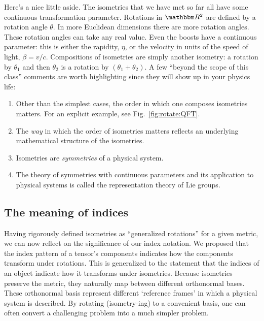 \documentclass[12pt]{article}
\begin{document}
Here's a nice little aside. The isometries that we have met so far all have some continuous transformation parameter. Rotations in $\RR^2$ are defined by  a rotation angle $\theta$. In more Euclidean dimensions there are more rotation angles. These rotation angles can take any real value. Even the boosts have a continuous parameter: this is either the rapidity, $\eta$, or the velocity in units of the speed of light, $\beta = v/c$. Compositions of isometries are simply another isometry: a rotation by $\theta_1$ and then $\theta_2$ is a rotation by $(\theta_1+\theta_2)$. A few ``beyond the scope of this class'' comments are worth highlighting since they will show up in your physics life:
\begin{enumerate}
    \item Other than the simplest cases, the order in which one composes isometries matters. For an explicit example, see Fig.~\ref{fig:rotate:QFT}.
    \item The \emph{way} in which the order of isometries matters reflects an underlying mathematical structure of the isometries. 
    \item Isometries are \emph{symmetries} of a physical system. 
    \item The theory of symmetries with continuous parameters and its application to physical systems is called the representation theory of Lie groups. 
\end{enumerate}






\subsection{The meaning of indices}

Having rigorously defined isometries as ``generalized rotations'' for a given metric, we can now reflect on the significance of our index notation. We proposed that the index pattern of a tensor's components indicates how the components transform under rotations. This is generalized to the statement that the indices of an object indicate how it transforms under isometries. Because isometries preserve the metric, they naturally map between different orthonormal bases. These orthonormal basis represent different `reference frames' in which a physical system is described. By rotating (isometry-ing) to a convenient basis, one can often convert a challenging problem into a much simpler problem.  
\end{document}
